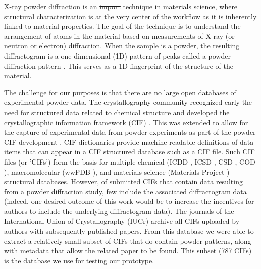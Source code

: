 \documentclass[preprint]{iucr}
\newcommand{\sjb}[1]{\textcolor{blue}{[sjb:#1]}}
\newcommand{\sw}[1]{\textcolor{green}{[sw:#1]}}
\providecommand{\DIFadd}[1]{{\protect\color{blue}\uwave{#1}}} %
\providecommand{\DIFdel}[1]{{\protect\color{red}\sout{#1}}}                      %
\providecommand{\DIFaddbegin}{} %
\providecommand{\DIFaddend}{} %
\providecommand{\DIFdelbegin}{} %
\providecommand{\DIFdelend}{} %
\newcommand{\DIFscaledelfig}{0.5}
\newlength{\DIFdelgraphicswidth} %
\newlength{\DIFdelgraphicsheight} %
\newcommand{\DIFaddincludegraphics}[2][]{{\color{blue}\fbox{\DIFOincludegraphics[#1]{#2}}}} %
\newcommand{\DIFdelincludegraphics}[2][]{%
\sbox{\DIFdelgraphicsbox}{\DIFOincludegraphics[#1]{#2}}%
\settoboxwidth{\DIFdelgraphicswidth}{\DIFdelgraphicsbox} %
\settoboxtotalheight{\DIFdelgraphicsheight}{\DIFdelgraphicsbox} %
\scalebox{\DIFscaledelfig}{%
\parbox[b]{\DIFdelgraphicswidth}{\usebox{\DIFdelgraphicsbox}\\[-\baselineskip] \rule{\DIFdelgraphicswidth}{0em}}\llap{\resizebox{\DIFdelgraphicswidth}{\DIFdelgraphicsheight}{%
\setlength{\unitlength}{\DIFdelgraphicswidth}%
\begin{picture}(1,1)%
\thicklines\linethickness{2pt} %
{\color[rgb]{1,0,0}\put(0,0){\framebox(1,1){}}}%
{\color[rgb]{1,0,0}\put(0,0){\line( 1,1){1}}}%
{\color[rgb]{1,0,0}\put(0,1){\line(1,-1){1}}}%
\end{picture}%
}\hspace*{3pt}}} %
} %
\DeclareRobustCommand{\DIFaddbegin}{\DIFOaddbegin \let\includegraphics\DIFaddincludegraphics} %
\DeclareRobustCommand{\DIFaddend}{\DIFOaddend \let\includegraphics\DIFOincludegraphics} %
\DeclareRobustCommand{\DIFdelbegin}{\DIFOdelbegin \let\includegraphics\DIFdelincludegraphics} %
\DeclareRobustCommand{\DIFdelend}{\DIFOaddend \let\includegraphics\DIFOincludegraphics} %
\begin{document}
X-ray powder diffraction is an \DIFdelbegin \DIFdel{import }\DIFdelend \DIFaddbegin \DIFadd{important }\DIFaddend technique in materials science, where structural characterization is at the very center of the workflow as it is inherently linked to material properties. The goal of the technique is to understand the arrangement of atoms in the material based on measurements of X-ray (or neutron or electron) diffraction.  When the sample is a powder, the resulting diffractogram is a one-dimensional (1D) pattern of peaks called a powder diffraction pattern \cite{gilmoreInternationalTablesCrystallography2019a,dinnebierPowderDiffractionTheory2008c}.
This serves as a 1D fingerprint of the structure of the material.

The challenge for our purposes is that there are no large open databases of experimental powder data.  The crystallography community recognized early the need for structured data related to chemical structure and developed the crystallographic information framework (CIF) \cite{hall;aca91}.  This was extended 
to allow for the capture of experimental data from powder experiments as part of the powder CIF development \cite{hallInternationalTablesCrystallography2006}. CIF dictionaries provide machine-readable definitions of data items that can appear in a CIF structured database such as a CIF file. Such CIF files (or 'CIFs') form the basis for multiple chemical (ICDD \cite{gates-rectorPowderDiffractionFile2019}, ICSD \cite{zagoracRecentDevelopmentsInorganic2019}, CSD \cite{groomCambridgeStructuralDatabase2016}, COD \cite{grazulisCrystallographyOpenDatabase2009d}), macromolecular (wwPDB \cite{bermanProteinDataBank2000}), and materials science (Materials Project \cite{jainCommentaryMaterialsProject2013d}) structural databases. 
However, of submitted CIFs that contain data resulting from a powder diffraction study, few include the associated diffractogram data (indeed, one desired outcome of this work would be to increase the incentives for authors to include the underlying diffractogram data).  The journals of the International Union of Crystallography (IUCr) archive all CIFs uploaded by authors with subsequently published papers. From this database we were able to extract a relatively small subset of CIFs that do contain powder patterns, along with metadata that allow the related paper to be found. This subset (787 CIFs) is the database we use for testing our prototype.
\end{document}
